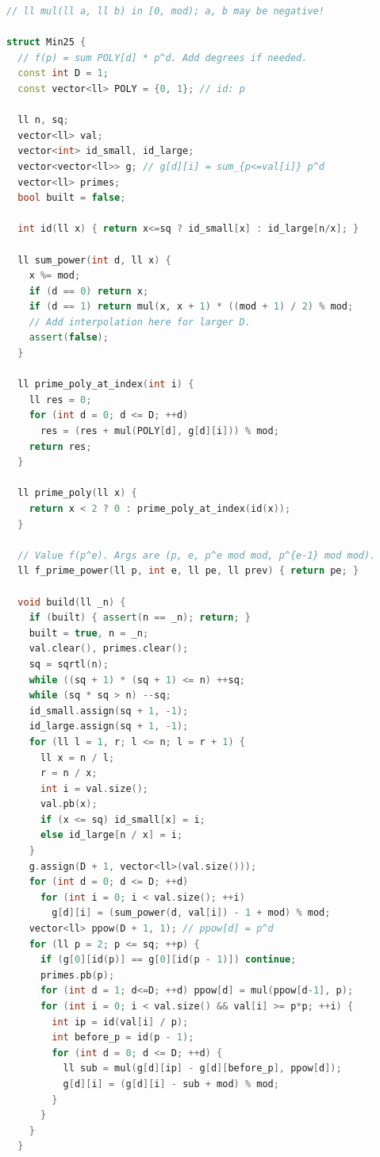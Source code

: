 \documentclass[8pt,a4paper,landscape,twosided]{extarticle}
\begin{document}
\begin{multicols*}{3}
\begin{lstlisting}[language=C++]
// ll mul(ll a, ll b) in [0, mod); a, b may be negative!

struct Min25 {
  // f(p) = sum POLY[d] * p^d. Add degrees if needed.
  const int D = 1;
  const vector<ll> POLY = {0, 1}; // id: p

  ll n, sq;
  vector<ll> val;
  vector<int> id_small, id_large;
  vector<vector<ll>> g; // g[d][i] = sum_{p<=val[i]} p^d
  vector<ll> primes;
  bool built = false;

  int id(ll x) { return x<=sq ? id_small[x] : id_large[n/x]; }

  ll sum_power(int d, ll x) {
    x %= mod;
    if (d == 0) return x;
    if (d == 1) return mul(x, x + 1) * ((mod + 1) / 2) % mod;
    // Add interpolation here for larger D.
    assert(false);
  }

  ll prime_poly_at_index(int i) {
    ll res = 0;
    for (int d = 0; d <= D; ++d)
      res = (res + mul(POLY[d], g[d][i])) % mod;
    return res;
  }

  ll prime_poly(ll x) {
    return x < 2 ? 0 : prime_poly_at_index(id(x));
  }

  // Value f(p^e). Args are (p, e, p^e mod mod, p^{e-1} mod mod).
  ll f_prime_power(ll p, int e, ll pe, ll prev) { return pe; }

  void build(ll _n) {
    if (built) { assert(n == _n); return; }
    built = true, n = _n;
    val.clear(), primes.clear();
    sq = sqrtl(n);
    while ((sq + 1) * (sq + 1) <= n) ++sq;
    while (sq * sq > n) --sq;
    id_small.assign(sq + 1, -1);
    id_large.assign(sq + 1, -1);
    for (ll l = 1, r; l <= n; l = r + 1) {
      ll x = n / l;
      r = n / x;
      int i = val.size();
      val.pb(x);
      if (x <= sq) id_small[x] = i;
      else id_large[n / x] = i;
    }
    g.assign(D + 1, vector<ll>(val.size()));
    for (int d = 0; d <= D; ++d)
      for (int i = 0; i < val.size(); ++i)
        g[d][i] = (sum_power(d, val[i]) - 1 + mod) % mod;
    vector<ll> ppow(D + 1, 1); // ppow[d] = p^d
    for (ll p = 2; p <= sq; ++p) {
      if (g[0][id(p)] == g[0][id(p - 1)]) continue;
      primes.pb(p);
      for (int d = 1; d<=D; ++d) ppow[d] = mul(ppow[d-1], p);
      for (int i = 0; i < val.size() && val[i] >= p*p; ++i) {
        int ip = id(val[i] / p);
        int before_p = id(p - 1);
        for (int d = 0; d <= D; ++d) {
          ll sub = mul(g[d][ip] - g[d][before_p], ppow[d]);
          g[d][i] = (g[d][i] - sub + mod) % mod;
        }
      }
    }
  }


\end{lstlisting}
\end{multicols*}
\end{document}
